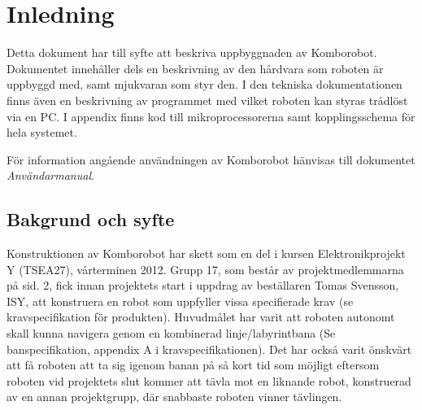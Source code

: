 
%
%


\section{Inledning}
Detta dokument har till syfte att beskriva uppbyggnaden av Komborobot.
Dokumentet innehåller dels en beskrivning av den hårdvara som roboten är 
uppbyggd med, samt mjukvaran som styr den. I den tekniska dokumentationen 
finns även en beskrivning av programmet med vilket roboten kan styras 
trådlöst via en PC. I appendix finns kod till mikroprocessorerna samt
kopplingsschema för hela systemet. 

För information angående användningen av Komborobot hänvisas till dokumentet 
\emph{Användarmanual}. 

\subsection{Bakgrund och syfte}
Konstruktionen av Komborobot har skett som en del i kursen Elektronikprojekt 
Y (TSEA27), vårterminen 2012. Grupp 17, som består av projektmedlemmarna på 
sid. 2, fick innan projektets start i uppdrag av beställaren Tomas Svensson, 
ISY, att konstruera en robot som uppfyller vissa specifierade krav (se 
kravspecifikation för produkten). Huvudmålet har varit att roboten autonomt 
skall kunna navigera genom en kombinerad linje/labyrintbana (Se 
banspecifikation, appendix A i kravspecifikationen).  Det har också varit 
önskvärt att få roboten att ta sig igenom banan på så kort tid som möjligt 
eftersom roboten vid projektets slut kommer att tävla mot en liknande robot, 
konstruerad av en annan projektgrupp, där snabbaste roboten vinner tävlingen.
